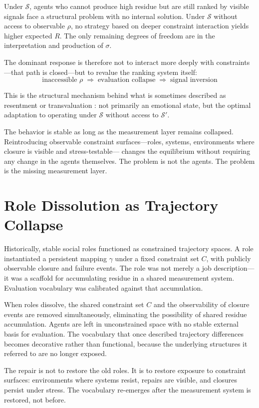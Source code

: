 \documentclass[12pt]{article}
\begin{document}
Under $\mathcal{S}$, agents who cannot produce high residue but are
still ranked by visible signals face a structural problem with no
internal solution. Under $\mathcal{S}$ without access to observable
$\rho$, no strategy based on deeper constraint interaction yields higher
expected $R$. The only remaining degrees of freedom are in the
interpretation and production of $\sigma$.

The dominant response is therefore not to interact more deeply with
constraints---that path is closed---but to revalue the ranking system
itself:
\[
  \text{inaccessible } \rho
  \;\Rightarrow\;
  \text{evaluation collapse}
  \;\Rightarrow\;
  \text{signal inversion}
\]

This is the structural mechanism behind what is sometimes described as
resentment or transvaluation \cite{kahneman1979}: not primarily an
emotional state, but the optimal adaptation to operating under
$\mathcal{S}$ without access to $\mathcal{S}'$.

The behavior is stable as long as the measurement layer remains
collapsed. Reintroducing observable constraint surfaces---roles,
systems, environments where closure is visible and stress-testable---
changes the equilibrium without requiring any change in the agents
themselves. The problem is not the agents. The problem is the missing
measurement layer.

\section{Role Dissolution as Trajectory Collapse}

Historically, stable social roles functioned as constrained trajectory
spaces. A role instantiated a persistent mapping $\gamma$ under a fixed
constraint set $C$, with publicly observable closure and failure events.
The role was not merely a job description---it was a scaffold for
accumulating residue in a shared measurement system. Evaluation
vocabulary was calibrated against that accumulation.

When roles dissolve, the shared constraint set $C$ and the
observability of closure events are removed simultaneously, eliminating
the possibility of shared residue accumulation. Agents are left in
unconstrained space with no stable external basis for evaluation. The
vocabulary that once described trajectory differences becomes decorative
rather than functional, because the underlying structures it referred to
are no longer exposed.

The repair is not to restore the old roles. It is to restore exposure
to constraint surfaces: environments where systems resist, repairs are
visible, and closures persist under stress. The vocabulary re-emerges
after the measurement system is restored, not before.
\end{document}
